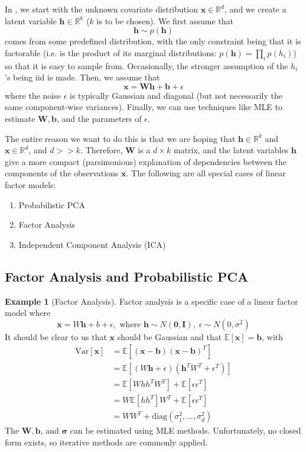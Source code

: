 \documentclass{article}
\theoremstyle{definition}
\newtheorem{example}{Example}[section]
\theoremstyle{remark}
\theoremstyle{definition}
\begin{document}
In , we start with the unknown covariate distribution $\mathbf{x} \in \mathbb{R}^d$, and we create a latent variable $\mathbf{h} \in \mathbb{R}^k$ ($k$ is to be chosen). We first assume that 
\[\mathbf{h} \sim p(\mathbf{h})\] 
comes from some predefined distribution, with the only constraint being that it is factorable (i.e. is the product of its marginal distributions: $p(\mathbf{h}) = \prod_i p(h_i)$) so that it is easy to sample from. Occasionally, the stronger assumption of the $h_i$'s being iid is made. Then, we assume that 
\[\mathbf{x} = \mathbf{W} \mathbf{h} + \mathbf{b} + \epsilon\] 
where the noise $\epsilon$ is typically Gaussian and diagonal (but not necessarily the same component-wise variances). Finally, we can use techniques like MLE to estimate $\mathbf{W}, \mathbf{b}$, and the parameters of $\epsilon$.  

The entire reason we want to do this is that we are hoping that $\mathbf{h} \in \mathbb{R}^k$ and $\mathbf{x} \in \mathbb{R}^d$, and $d >> k$. Therefore, $\mathbf{W}$ is a $d \times k$ matrix, and the latent variables $\mathbf{h}$ give a more compact (parsimonious)  explanation of dependencies between the components of the observations $\mathbf{x}$. The following are all special cases of linear factor models: 
\begin{enumerate}
    \item Probabilistic PCA
    \item Factor Analysis
    \item Independent Component Analysis (ICA)
\end{enumerate}

\subsection{Factor Analysis and Probabilistic PCA}

\begin{example}[Factor Analysis] 
Factor analysis is a specific case of a linear factor model where 
\[\mathbf{x} = W \mathbf{h} + b + \epsilon, \text{ where } \mathbf{h} \sim N(\mathbf{0}, \mathbf{I}), \; \epsilon \sim N(0, \sigma^2)\] 
It should be clear to us that $\mathbf{x}$ should be Gaussian and that $\mathbb{E}[\mathbf{x}] = \mathbf{b}$, with 
\begin{align*} 
    \mathrm{Var}[\mathbf{x}] & = \mathbb{E}[ (\mathbf{x} - \mathbf{b})( \mathbf{x} - \mathbf{b})^T ] \\
                             & = \mathbb{E}[ (W \mathbf{h} + \epsilon) (\mathbf{h}^T W^T + \epsilon^T)] \\
                             & = \mathbb{E}[W h h^T W^T] + \mathbb{E}[ \epsilon \epsilon^T] \\
                             & = W \mathbb{E}[ h h^T] W^T + \mathbb{E}[ \epsilon \epsilon^T] \\
                             & = W W^T + \mathrm{diag}(\sigma_1^2, \ldots, \sigma_d^2) 
\end{align*} 
The $\mathbf{W}, \mathbf{b}$, and $\boldsymbol{\sigma}$ can be estimated using MLE methods. Unfortunately, no closed form  exists, so iterative methods are commonly applied. 
\end{example} 
\end{document}
